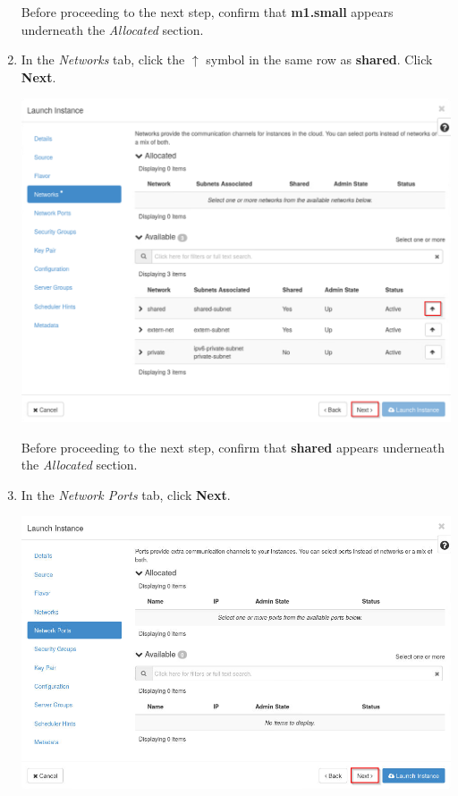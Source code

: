 \documentclass[letterpaper, 12pt]{article}
\begin{document}
\begin{enumerate}
    \begin{stopbox}
        Before proceeding to the next step, confirm that \textbf{m1.small} appears underneath the \textit{Allocated}
        section.
    \end{stopbox}

    \item In the \textit{Networks} tab, click the $\uparrow$ symbol in the same row as \textbf{shared}. Click
    \textbf{Next}.

    \begin{center}
        \includegraphics[width=\linewidth]{images/part2/step6.png}
    \end{center}

    \begin{stopbox}
        Before proceeding to the next step, confirm that \textbf{shared} appears underneath the \textit{Allocated}
        section.
    \end{stopbox}

    \item In the \textit{Network Ports} tab, click \textbf{Next}.
    
    \begin{center}
        \includegraphics[width=\linewidth]{images/part2/step7.png}
    \end{center}


\end{enumerate}
\end{document}
